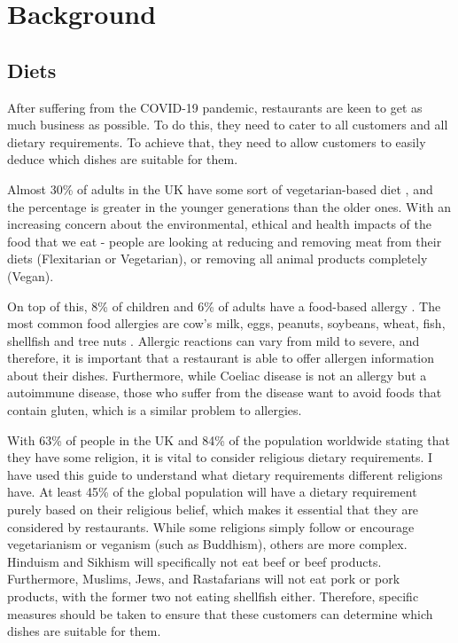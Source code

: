 \chapter{Background}

\section{Diets}

After suffering from the COVID-19 pandemic, restaurants are keen to get as much business as possible. To do this, they need to cater to all customers and all dietary requirements. To achieve that, they need to allow customers to easily deduce which dishes are suitable for them.

Almost 30\% of adults in the UK have some sort of vegetarian-based diet \cite{vege_2022}, and the percentage is greater in the younger generations than the older ones. With an increasing concern about the environmental, ethical and health impacts of the food that we eat - people are looking at reducing and removing meat from their diets (Flexitarian or Vegetarian), or removing all animal products completely (Vegan).

On top of this, 8\% of children and 6\% of adults have a food-based allergy \cite{sicherer_sampson_2017}. The most common food allergies are cow's milk, eggs, peanuts, soybeans, wheat, fish, shellfish and tree nuts \cite{allergies_west_2023}. Allergic reactions can vary from mild to severe, and therefore, it is important that a restaurant is able to offer allergen information about their dishes. Furthermore, while Coeliac disease is not an allergy but a autoimmune disease, those who suffer from the disease want to avoid foods that contain gluten, which is a similar problem to allergies.

With 63\% of people in the UK \cite{religion_ons_census_2021} and 84\% of the population worldwide \cite{hackett_grim_2012} stating that they have some religion, it is vital to consider religious dietary requirements. I have used this guide \cite{guidance_on_foods_for_religious_faiths_2009} to understand what dietary requirements different religions have. At least 45\% of the global population will have a dietary requirement purely based on their religious belief, which makes it essential that they are considered by restaurants. While some religions simply follow or encourage vegetarianism or veganism (such as Buddhism), others are more complex. Hinduism and Sikhism will specifically not eat beef or beef products. Furthermore, Muslims, Jews, and Rastafarians will not eat pork or pork products, with the former two not eating shellfish either. Therefore, specific measures should be taken to ensure that these customers can determine which dishes are suitable for them.

